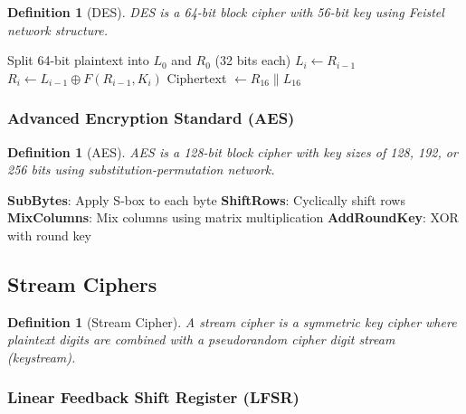 \documentclass[11pt,a4paper]{article}
\newtheorem{definition}[theorem]{Definition}
\begin{document}
\begin{definition}[DES]
DES is a 64-bit block cipher with 56-bit key using Feistel network structure.
\end{definition}

\begin{algorithm}
\caption{DES Encryption}
\begin{algorithmic}[1]
\STATE Split 64-bit plaintext into $L_0$ and $R_0$ (32 bits each)
    \STATE $L_i \leftarrow R_{i-1}$
    \STATE $R_i \leftarrow L_{i-1} \oplus F(R_{i-1}, K_i)$
\ENDFOR
\STATE Ciphertext $\leftarrow R_{16} \| L_{16}$
\end{algorithmic}
\end{algorithm}

\subsubsection{Advanced Encryption Standard (AES)}

\begin{definition}[AES]
AES is a 128-bit block cipher with key sizes of 128, 192, or 256 bits using substitution-permutation network.
\end{definition}

\begin{algorithm}
\caption{AES Round Function}
\begin{algorithmic}[1]
\STATE \textbf{SubBytes}: Apply S-box to each byte
\STATE \textbf{ShiftRows}: Cyclically shift rows
\STATE \textbf{MixColumns}: Mix columns using matrix multiplication
\STATE \textbf{AddRoundKey}: XOR with round key
\end{algorithmic}
\end{algorithm}

\subsection{Stream Ciphers}

\begin{definition}[Stream Cipher]
A stream cipher is a symmetric key cipher where plaintext digits are combined with a pseudorandom cipher digit stream (keystream).
\end{definition}

\subsubsection{Linear Feedback Shift Register (LFSR)}
\end{document}
